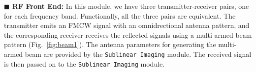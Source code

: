 

{\bf $\blacksquare$ RF Front End:}
In this module, we have three transmitter-receiver pairs, one for each frequency band. Functionally, all the three pairs are equivalent.
The transmitter emits an FMCW signal with an omnidrectional antenna pattern, and the corresponding receiver receives the reflected signals using a multi-armed beam pattern (Fig.~\ref{fig:beam1}). The antenna parameters for generating the multi-armed beam are provided by the \texttt{Sublinear Imaging} module.  %
The received signal is then passed on to the \texttt{Sublinear Imaging} module.







